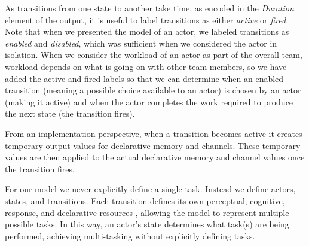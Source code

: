 As transitions from one state to another take time, as encoded in the {\em Duration} element of the output, it is useful to label transitions as either {\em active} or {\em fired}.  Note that when we presented the model of an actor, we labeled transitions as {\em enabled} and {\em disabled}, which was sufficient when we considered the actor in isolation.  When we consider the workload of an actor as part of the overall team, workload depends on what is going on with other team members, so we have added the active and fired labels so that we can determine when an enabled transition (meaning a possible choice available to an actor) is chosen by an actor (making it active) and when the actor completes the work required to produce the next state (the transition fires).  

From an implementation perspective, when a transition becomes active it creates temporary
output values for declarative memory and channels.  These temporary values are
then applied to the actual declarative memory and channel values once the transition fires.

For our model we never explicitly define a single task.  Instead
we define actors, states, and transitions.  Each transition defines its own
perceptual, cognitive, response, and declarative resources \cite{salvucci2008threaded}, allowing the model to represent multiple possible tasks.  In this way, an actor's state
determines what task(s) are being performed, achieving multi-tasking without
explicitly defining tasks. 



